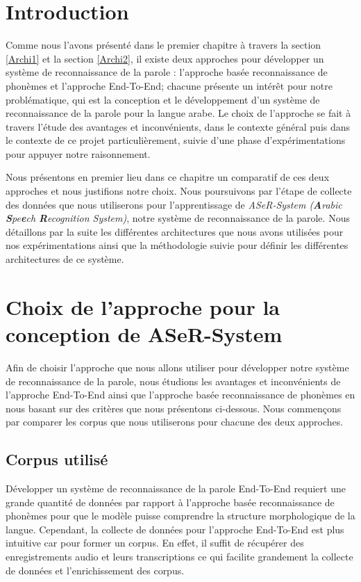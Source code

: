 
\section{Introduction}
Comme nous l'avons présenté dans le premier chapitre à travers la section \ref{Archi1} et la section \ref{Archi2}, il existe deux approches pour développer un système de reconnaissance de la parole : l'approche basée reconnaissance de phonèmes et l'approche End-To-End; chacune présente un intérêt pour notre problématique, qui est la conception et le développement d'un système de reconnaissance de la parole pour la langue arabe. Le choix de l'approche se fait à travers l'étude des avantages et inconvénients, dans le contexte général puis dans le contexte de ce projet particulièrement, suivie d'une phase d'expérimentations pour appuyer notre raisonnement.

Nous présentons en premier lieu dans ce chapitre un comparatif de ces deux approches et nous justifions notre choix. Nous poursuivons par l'étape de collecte des données que nous utiliserons pour l'apprentissage de \textit{ASeR-System (\textbf{A}rabic \textbf{S}pe\textbf{e}ch \textbf{R}ecognition System)}, notre système de reconnaissance de la parole. Nous détaillons par la suite les différentes architectures que nous avons utilisées pour nos expérimentations ainsi que la méthodologie suivie pour définir les différentes architectures de ce système. 

\section{Choix de l'approche pour la conception de ASeR-System}
Afin de choisir l'approche que nous allons utiliser pour développer notre système de reconnaissance de la parole, nous étudions les avantages et inconvénients de l'approche End-To-End ainsi que l'approche basée reconnaissance de phonèmes en nous basant sur des critères que nous présentons ci-dessous. Nous commençons par comparer les corpus que nous utiliserons pour chacune des deux approches.

\subsection{Corpus utilisé}
Développer un système de reconnaissance de la parole End-To-End requiert une grande quantité de données par rapport à l'approche basée reconnaissance de phonèmes pour que le modèle puisse comprendre la structure morphologique de la langue. Cependant, la collecte de données pour l'approche End-To-End est plus intuitive car pour former un corpus. En effet, il suffit de récupérer des enregistrements audio et leurs transcriptions ce qui facilite grandement la collecte de données et l'enrichissement des corpus.


